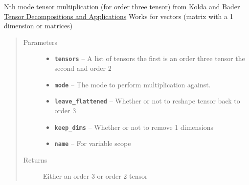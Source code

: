 \documentclass[letterpaper,10pt,english]{sphinxmanual}
\begin{document}

\begin{fulllineitems}
\label{node_ops:node_ops.nmode_tensor_multiply}
Nth mode tensor multiplication (for order three tensor) from Kolda and Bader \href{http://dl.acm.org/citation.cfm?id=1655230}{Tensor Decompositions and Applications}
Works for vectors (matrix with a 1 dimension or matrices)
\begin{quote}\begin{description}
\item[{Parameters}] \leavevmode\begin{itemize}
\item {} 
\textbf{\texttt{tensors}} -- A list of tensors the first is an order three tensor the second and order 2

\item {} 
\textbf{\texttt{mode}} -- The mode to perform multiplication against.

\item {} 
\textbf{\texttt{leave\_flattened}} -- Whether or not to reshape tensor back to order 3

\item {} 
\textbf{\texttt{keep\_dims}} -- Whether or not to remove 1 dimensions

\item {} 
\textbf{\texttt{name}} -- For variable scope

\end{itemize}

\item[{Returns}] \leavevmode
Either an order 3 or order 2 tensor

\end{description}\end{quote}

\end{fulllineitems}

\end{document}
